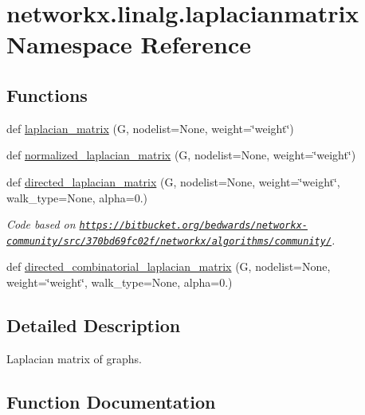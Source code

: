 \hypertarget{namespacenetworkx_1_1linalg_1_1laplacianmatrix}{}\section{networkx.\+linalg.\+laplacianmatrix Namespace Reference}
\label{namespacenetworkx_1_1linalg_1_1laplacianmatrix}
\subsection*{Functions}
\begin{DoxyCompactItemize}
\item 
def \hyperlink{namespacenetworkx_1_1linalg_1_1laplacianmatrix_a74be88be72c1aafd144a63202df9e77f}{laplacian\+\_\+matrix} (G, nodelist=None, weight=\char`\"{}weight\char`\"{})
\item 
def \hyperlink{namespacenetworkx_1_1linalg_1_1laplacianmatrix_ac26531196d011cf45284a537796ac537}{normalized\+\_\+laplacian\+\_\+matrix} (G, nodelist=None, weight=\char`\"{}weight\char`\"{})
\item 
def \hyperlink{namespacenetworkx_1_1linalg_1_1laplacianmatrix_accd9ad151a806626d9a2577168a2fb42}{directed\+\_\+laplacian\+\_\+matrix} (G, nodelist=None, weight=\char`\"{}weight\char`\"{}, walk\+\_\+type=None, alpha=0.)
\begin{DoxyCompactList}\small\item\em Code based on \href{https://bitbucket.org/bedwards/networkx-community/src/370bd69fc02f/networkx/algorithms/community/}{\tt https\+://bitbucket.\+org/bedwards/networkx-\/community/src/370bd69fc02f/networkx/algorithms/community/}. \end{DoxyCompactList}\item 
def \hyperlink{namespacenetworkx_1_1linalg_1_1laplacianmatrix_a6b45724805b344924a5bf8cc15a35472}{directed\+\_\+combinatorial\+\_\+laplacian\+\_\+matrix} (G, nodelist=None, weight=\char`\"{}weight\char`\"{}, walk\+\_\+type=None, alpha=0.)
\end{DoxyCompactItemize}


\subsection{Detailed Description}
\begin{DoxyVerb}Laplacian matrix of graphs.
\end{DoxyVerb}
 

\subsection{Function Documentation}
\mbox{\label{namespacenetworkx_1_1linalg_1_1laplacianmatrix_a6b45724805b344924a5bf8cc15a35472}} 
